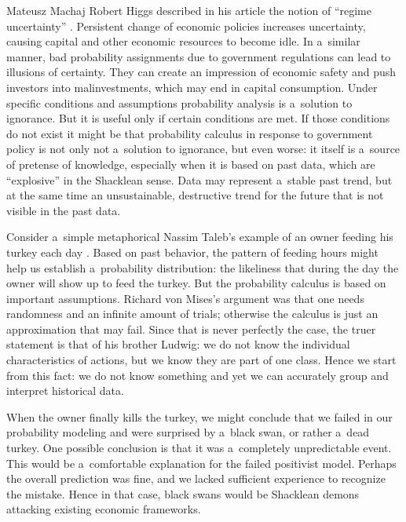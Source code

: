 \begin{artengenv}{Mateusz Machaj}
Robert Higgs described in his article the notion of ``regime uncertainty'' 
\parencite[][]{higgs_regime_1997}. %
 Persistent change of economic policies increases uncertainty, causing capital and other economic resources to become idle. In a~similar manner, bad probability assignments due to government regulations can lead to illusions of certainty. They can create an impression of economic safety and push investors into malinvestments, which may end in capital consumption. Under specific conditions and assumptions probability analysis is a~solution to ignorance. But it is useful only if certain conditions are met. If those conditions do not exist it might be that probability calculus in response to government policy is not only not a~solution to ignorance, but even worse: it itself is a~source of pretense of knowledge, especially when it is based on past data, which are ``explosive'' in the Shacklean sense. Data may represent a~stable past trend, but at the same time an unsustainable, destructive trend for the future that is not visible in the past data.



Consider a~simple metaphorical Nassim Taleb's example of an owner feeding his turkey each day 
\parencite[][]{taleb_black_2007}. %
 Based on past behavior, the pattern of feeding hours might help us establish a~probability distribution: the likeliness that during the day the owner will show up to feed the turkey. But the probability calculus is based on important assumptions. Richard von Mises's argument was that one needs randomness and an infinite amount of trials; otherwise the calculus is just an approximation that may fail. Since that is never perfectly the case, the truer statement is that of his brother Ludwig: we do not know the individual characteristics of actions, but we know they are part of one class. Hence we start from this fact: we do not know something and yet we can accurately group and interpret historical data.



When the owner finally kills the turkey, we might conclude that we failed in our probability modeling and were surprised by a~black swan, or rather a~dead turkey. One possible conclusion is that it was a~completely unpredictable event. This would be a~comfortable explanation for the failed positivist model. Perhaps the overall prediction was fine, and we lacked sufficient experience to recognize the mistake. Hence in that case, black swans would be Shacklean demons attacking existing economic frameworks.




\end{artengenv}
